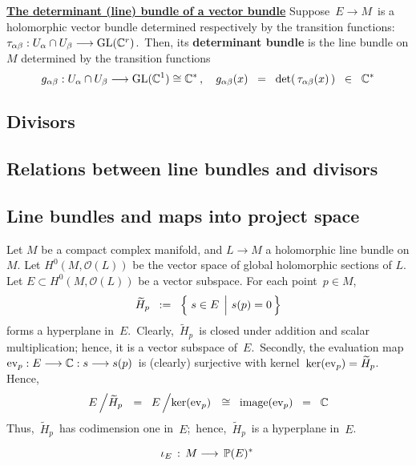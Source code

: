 \vskip 0.5cm
\noindent
\underline{\textbf{The determinant (line) bundle of a vector bundle}}
\vskip 0.1cm
\noindent
Suppose
\,$E \longrightarrow M$\,
is a holomorphic vector bundle
determined respectively by the transition functions:
\,$\tau_{\alpha\beta} : U_{\alpha} \cap U_{\beta} \longrightarrow \GL(\C^{r})$.\,
Then, its \textbf{determinant bundle} is the line bundle on $M$
determined by the transition functions
\begin{equation*}
g_{\alpha\beta} : U_{\alpha} \cap U_{\beta} \longrightarrow \GL(\C^{1}) \cong \C^{*}\,,
\quad
g_{\alpha\beta}(x)
\;\; = \;\;
	\det\!\left(\,\tau_{\alpha\beta}(x)\,\right)
\;\; \in \;\;
	\C^{*}
\end{equation*}


\subsection{Divisors}


\subsection{Relations between line bundles and divisors}


\vskip 1.0cm
\subsection{Line bundles and maps into project space}

Let $M$ be a compact complex manifold, and $L \longrightarrow M$ a holomorphic line bundle on $M$.
Let $H^{0}(M,\mathcal{O}(L))$ be the vector space of global holomorphic sections of $L$.
Let $E \subset H^{0}(M,\mathcal{O}(L))$ be a vector subspace.
For each point \,$p \in M$,
\begin{equation*}
\widetilde{H}_{p} \;\; := \;\; \left\{\,\left. s \overset{{\color{white}.}}{\in} E \,\;\right\vert\, s(p) = 0\,\right\}
\end{equation*}
forms a hyperplane in \,$E$.\,
Clearly, \,$\widetilde{H}_{p}$\, is closed under addition and scalar multiplication;
hence, it is a vector subspace of \,$E$.\,
Secondly, the evaluation map
\,$\ev_{p} : E \longrightarrow \C : s \longrightarrow s(p)$\,
is (clearly) surjective with kernel
\,$\ker(\ev_{p}) = \widetilde{H}_{p}$.\,
Hence,
\begin{equation*}
E \left/ \widetilde{H}_{p}\right.
\;\; = \;\;
	E \left/ \overset{{\color{white}.}}{\ker}(\ev_{p}) \right.
\;\; \cong \;\;
	\image(\ev_{p})
\;\; = \;\;
	\C
\end{equation*}
Thus, \,$\widetilde{H}_{p}$\, has codimension one in \,$E$;\,
hence, \,$\widetilde{H}_{p}$\, is a hyperplane in \,$E$.\,

\begin{equation*}
\iota_{E} \, : \, M \longrightarrow \, \P(E)^{*}\,
\end{equation*}

